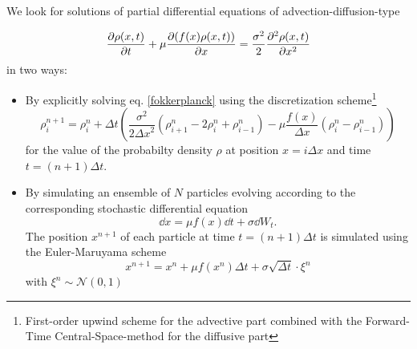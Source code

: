 

We look for solutions of partial differential equations of advection-diffusion-type

\begin{equation} 
\label{fokkerplanck}
\frac{\partial \rho(x,t)}{\partial t} + \mu \frac{\partial (f(x) \rho(x,t))}{\partial x} = \frac{\sigma^2}{2}  \frac{\partial^2 \rho(x,t)}{\partial x^2} 
\end{equation}
in two ways:
\begin{itemize}
\item By explicitly solving eq. \eqref{fokkerplanck} using the discretization scheme\footnote{First-order upwind scheme for the advective part combined with the Forward-Time Central-Space-method for the diffusive part}
\begin{equation} 
\label{pde_discretization}
\rho_i^{n+1} = \rho_i^n + \Delta t \left( \frac{\sigma^2}{2{\Delta x}^2} \left( \rho_{i+1}^{n} - 2 \rho_i^n + \rho_{i-1}^n \right)  - \mu \frac{f(x)}{\Delta x} (\rho_i^n - \rho_{i-1}^n) \right)
\end{equation}
for the value of the probabilty density $\rho$ at position $x=i \Delta x$ and time $t=(n+1) \Delta t$.
\item By simulating an ensemble of $N$ particles evolving according to the corresponding stochastic differential equation  
\begin{equation} 
\label{SDE}
    \dd x = \mu f(x) \dd t + \sigma \dd{W_t}.
\end{equation}
 The position $x^{n+1}$ of each  particle  at time $t= (n+1) \Delta t$ is simulated using the Euler-Maruyama scheme
\begin{equation}
   x^{n + 1} = x^{n} + \mu f(x^n) \Delta t +  \sigma \sqrt{\Delta t}\cdot \xi^n \label{Euler-Mar}
\end{equation}
with $\xi^n  \sim \mathcal{N} (0,1)$
\end{itemize}

